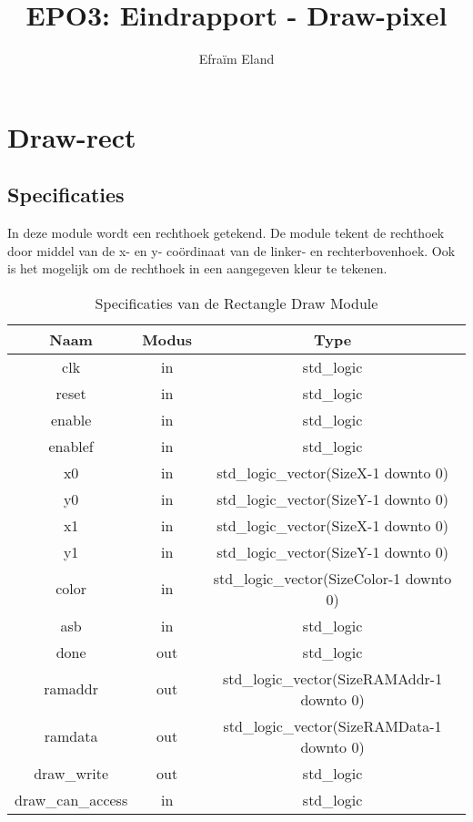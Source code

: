 \documentclass{scrartcl} %
\author{Efraïm Eland}%
\title{EPO3: Eindrapport - Draw-pixel}
\begin{document}
\section{Draw-rect} %
\label{sec:draw-rect}  %


\subsection{Specificaties}
In deze module wordt een rechthoek getekend. De module tekent de rechthoek door middel van de x- en y- coördinaat van de linker- en rechterbovenhoek. Ook is het mogelijk om de rechthoek in een aangegeven kleur te tekenen.

\begin{table}[H]
\centering
\caption{Specificaties van de Rectangle Draw Module}
\label{tab:spec-rect-draw}
\begin{tabular}{c c c}
	\hline\hline
 	Naam & Modus & Type\\
 	\hline	
	clk & in & std\_logic \\
	reset & in & std\_logic \\
	enable& in & std\_logic \\
	enablef& in & std\_logic\\
	x0 & in & std\_logic\_vector(SizeX-1 downto 0) \\
	y0 & in & std\_logic\_vector(SizeY-1 downto 0) \\
	x1 & in & std\_logic\_vector(SizeX-1 downto 0) \\
	y1 & in & std\_logic\_vector(SizeY-1 downto 0) \\
	color & in & std\_logic\_vector(SizeColor-1 downto 0) \\
	asb & in & std\_logic \\
	done & out & std\_logic \\
	ramaddr &out & std\_logic\_vector(SizeRAMAddr-1 downto 0) \\
	ramdata &out & std\_logic\_vector(SizeRAMData-1 downto 0) \\
	draw\_write &out & std\_logic \\
	draw\_can\_access & in & std\_logic \\
  	\hline
\end{tabular}
\end{table}

\end{document}
